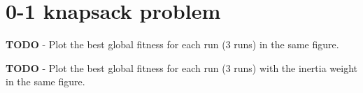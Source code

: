\section{0-1 knapsack problem}

\textbf{TODO} - Plot the best global fitness for each run (3 runs) in the same figure.

\textbf{TODO} - Plot the best global fitness for each run (3 runs) with the inertia weight in the same figure.
